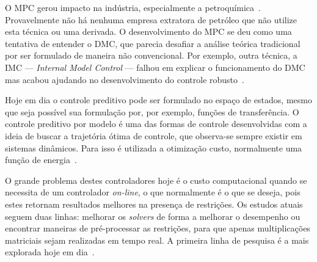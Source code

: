O MPC gerou impacto na indústria, especialmente a
petroquímica~\cite{article:morari}. Provavelmente não há nenhuma empresa
extratora de petróleo que não utilize esta técnica ou uma derivada. O
desenvolvimento do \ac{MPC} se deu como uma tentativa de entender o \ac{DMC},
que parecia desafiar a análise teórica tradicional por ser formulado de maneira
não convencional. Por exemplo, outra técnica, a \ac{IMC} ---
\textit{Internal Model Control} --- falhou em explicar o funcionamento do \ac{DMC}
mas acabou ajudando no desenvolvimento do controle
robusto~\cite{article:morari}.

Hoje em dia o controle preditivo pode ser formulado no espaço de estados, mesmo
que seja possível sua formulação por, por exemplo, funções de transferência. O
controle preditivo por modelo é uma das formas de controle desenvolvidas com a
ideia de buscar a trajetória ótima de controle, que observa-se sempre existir em
sistemas dinâmicos. Para isso é utilizada a otimização custo, normalmente uma
função de energia~\cite{article:morari,book:bryson}.

O grande problema destes controladores hoje é o custo computacional quando se
necessita de um controlador \textit{on-line}, o que normalmente é o que se
deseja, pois estes retornam resultados melhores na presença de restrições. Os
estudos atuais seguem duas linhas: melhorar os \textit{solvers} de forma a
melhorar o desempenho ou encontrar maneiras de pré-processar as restrições, para
que apenas multiplicações matriciais sejam realizadas em tempo real. A primeira
linha de pesquisa é a mais explorada hoje em
dia~\cite{book:wang,masterthesis:zhang}.
